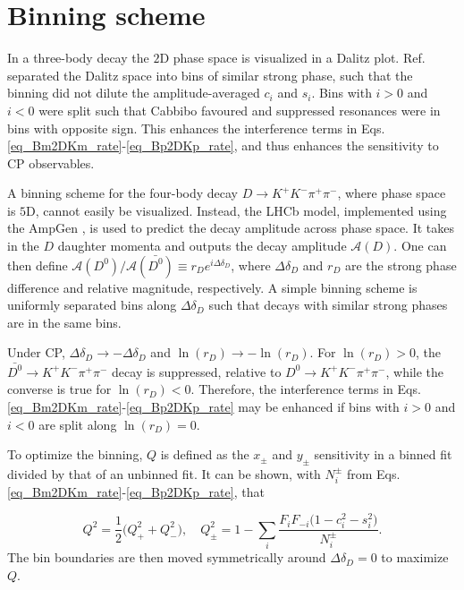 \documentclass[12pt, a4paper, notitlepage, onecolumn]{article}
\begin{document}
\section{Binning scheme}
\label{section_binning_scheme}
\noindent In a three-body decay the $2$D phase space is visualized in a Dalitz plot. Ref. \cite{cite_LHCbGGSZKSpipi} separated the Dalitz space into bins of similar strong phase, such that the binning did not dilute the amplitude-averaged $c_i$ and $s_i$. Bins with $i > 0$ and $i < 0$ were split such that Cabbibo favoured and suppressed resonances were in bins with opposite sign. This enhances the interference terms in Eqs. \eqref{eq_Bm2DKm_rate}-\eqref{eq_Bp2DKp_rate}, and thus enhances the sensitivity to CP observables.

A binning scheme for the four-body decay $D\to K^+K^-\pi^+\pi^-$, where phase space is $5$D, cannot easily be visualized. Instead, the LHCb model, implemented using the AmpGen \cite{cite_AmpGen}, is used to predict the decay amplitude across phase space. It takes in the $D$ daughter momenta and outputs the decay amplitude $\mathcal{A}(D)$. One can then define $\mathcal{A}(D^0)/\mathcal{A}(\bar{D^0})\equiv r_De^{i\Delta\delta_D}$, where $\Delta\delta_D$ and $r_D$ are the strong phase difference and relative magnitude, respectively. A simple binning scheme is uniformly separated bins along $\Delta\delta_D$ such that decays with similar strong phases are in the same bins.

Under CP, $\Delta\delta_D\to -\Delta\delta_D$ and $\ln(r_D)\to -\ln(r_D)$. For $\ln(r_D) > 0$, the $\bar{D^0}\to K^+K^-\pi^+\pi^-$ decay is suppressed, relative to $D^0\to K^+K^-\pi^+\pi^-$, while the converse is true for $\ln(r_D) < 0$. Therefore, the interference terms in Eqs. \eqref{eq_Bm2DKm_rate}-\eqref{eq_Bp2DKp_rate} may be enhanced if bins with $i > 0$ and $i < 0$ are split along $\ln(r_D) = 0$.

To optimize the binning, $Q$ is defined as the $x_\pm$ and $y_\pm$ sensitivity in a binned fit divided by that of an unbinned fit. It can be shown, with $N_i^\pm$ from Eqs. \eqref{eq_Bm2DKm_rate}-\eqref{eq_Bp2DKp_rate}, that

\begin{equation}
  Q^2 = \frac{1}{2}\big(Q^2_+ + Q^2_-\big), \quad Q^2_\pm = 1 - \sum_i\frac{F_iF_{-i}\big(1 - c_i^2 - s_i^2\big)}{N_i^\pm}.
  \label{eq_binning_Q}
\end{equation}
The bin boundaries are then moved symmetrically around $\Delta\delta_D = 0$ to maximize $Q$.
\end{document}
